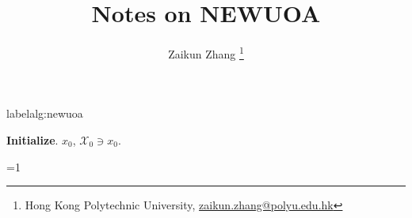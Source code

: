 \documentclass[12pt,a4paper,draft]{article}  %
\title{Notes on NEWUOA}
\date{\DTMnow}
\author{Zaikun Zhang
    \thanks{Hong Kong Polytechnic University, \url{zaikun.zhang@polyu.edu.hk}}
}
\newcommand{\bibfile}{\jobname.bib}  %
\newcommand{\iscite}{0}  %
\theoremstyle{definition}
\numberwithin{equation}{section}
\newcommand{\Int}{\mathcal{X}}
\begin{document}
\maketitle



\begin{algorithm}[htbp!]
    \caption{label{alg:newuoa}}
    \begin{algorithmic}[1]
        \State \textbf{Initialize}. $x_0$, $\Int_0 \ni x_0$. 
    \end{algorithmic}
\end{algorithm}


\ifnum\iscite=1
    \small
    
    
\fi

\end{document}
